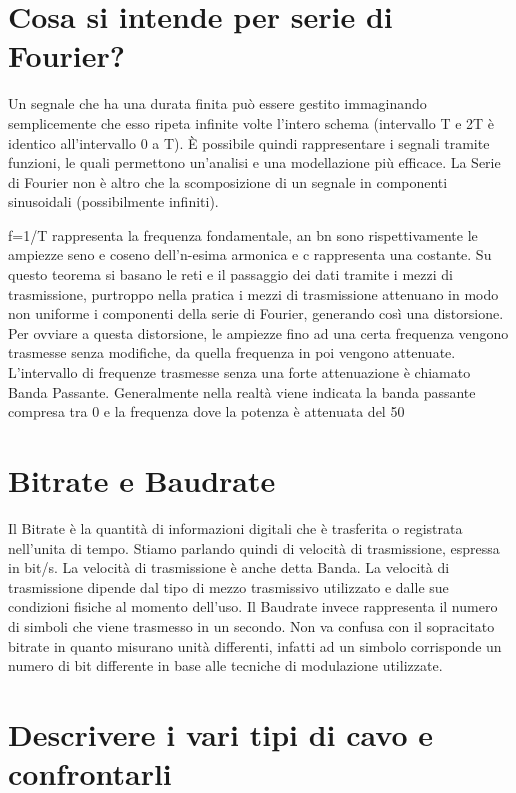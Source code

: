 \section{Cosa si intende per serie di Fourier?}
Un segnale che ha una durata finita può essere gestito immaginando semplicemente che esso ripeta infinite volte l’intero schema (intervallo T e 2T è identico all’intervallo 0 a T).
È possibile quindi rappresentare i segnali tramite funzioni, le quali permettono un’analisi e una modellazione più efficace.
La Serie di Fourier non è altro che la scomposizione di un segnale in componenti sinusoidali (possibilmente infiniti).
 
f=1/T rappresenta la frequenza fondamentale, an  bn  sono rispettivamente le ampiezze seno e coseno dell’n-esima armonica e c rappresenta una costante.
	Su questo teorema si basano le reti e il passaggio dei dati tramite i mezzi di trasmissione, purtroppo 	nella pratica i mezzi di trasmissione attenuano in modo non uniforme i componenti della serie di 	Fourier, generando così una distorsione. Per ovviare a questa distorsione, le ampiezze fino ad una 	certa frequenza vengono trasmesse senza modifiche, da quella frequenza in poi vengono attenuate.
	L’intervallo di frequenze trasmesse senza una forte attenuazione è chiamato Banda Passante.
Generalmente nella realtà viene indicata la banda passante compresa tra 0 e la frequenza dove la potenza è attenuata del 50%
\section{Bitrate e Baudrate}

Il Bitrate è la quantità di informazioni digitali che è trasferita o registrata nell’unita di tempo.
Stiamo parlando quindi di velocità di trasmissione, espressa in bit/s. La velocità di trasmissione è anche detta Banda. La velocità di trasmissione dipende dal tipo di mezzo trasmissivo utilizzato e dalle sue condizioni fisiche al momento dell’uso.
Il Baudrate invece rappresenta il numero di simboli che viene trasmesso in un secondo. Non va confusa con il sopracitato bitrate in quanto misurano unità differenti, infatti ad un simbolo corrisponde un numero di bit differente in base alle tecniche di modulazione utilizzate.

\section{Descrivere i vari tipi di cavo e confrontarli}

